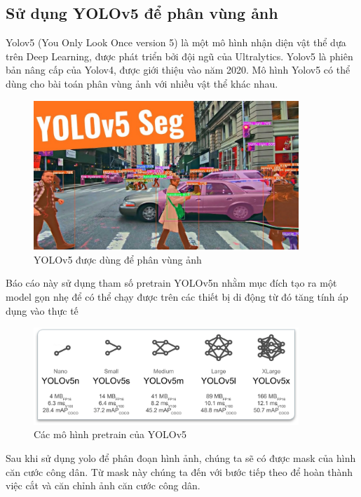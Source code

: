 \documentclass [10pt, fancyhdr, twoside] {article}
\begin{document}
\subsection{Sử dụng YOLOv5 để phân vùng ảnh}
Yolov5 (You Only Look Once version 5) là một mô hình nhận diện vật thể dựa trên Deep Learning, được phát triển bởi đội ngũ của Ultralytics. Yolov5 là phiên bản nâng cấp của Yolov4, được giới thiệu vào năm 2020.
Mô hình Yolov5 có thể dùng cho bài toán phân vùng ảnh với nhiều vật thể khác nhau.\\
\begin{figure}[h]
    \caption{YOLOv5 được dùng để phân vùng ảnh}
    \centering
    \includegraphics[width=10cm]{Picture3.jpg}
\end{figure}

\pagebreak
Báo cáo này sử dụng tham số pretrain YOLOv5n nhằm mục đích tạo ra một model gọn nhẹ để có thể chạy được trên các thiết bị di động từ đó tăng tính áp dụng vào thực tế
\begin{figure}[h]
    \caption{Các mô hình pretrain của YOLOv5}
    \centering
    \includegraphics[width=10cm]{Picture4.png}
\end{figure}


Sau khi sử dụng yolo để phân đoạn hình ảnh, chúng ta sẽ có được mask của hình căn cước công dân. Từ mask này chúng ta đến với bước tiếp theo để hoàn thành việc cắt và căn chỉnh ảnh căn cước công dân.
\end{document}
